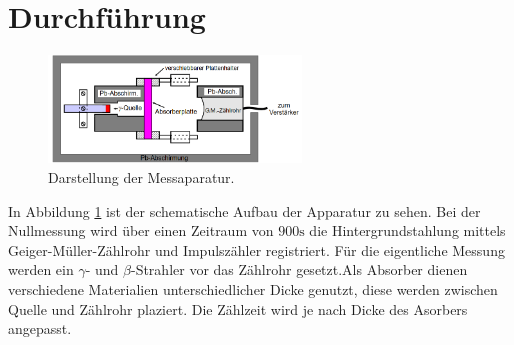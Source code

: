 \section{Durchführung}
\label{sec:Durchführung}
\begin{figure}
  \centering
  \includegraphics[width=0.6\textwidth]{aufbau.PNG}
  \caption{Darstellung der Messaparatur.}
  \label{fig:aufbau}
\end{figure}
In Abbildung \ref{fig:aufbau} ist der schematische Aufbau der Apparatur zu sehen.
Bei der Nullmessung wird über einen Zeitraum von $900\si{\second}$ die Hintergrundstahlung mittels
Geiger-Müller-Zählrohr und Impulszähler registriert.
Für die eigentliche Messung werden ein $\gamma$- und $\beta$-Strahler vor das Zählrohr gesetzt.Als
Absorber dienen verschiedene Materialien unterschiedlicher Dicke genutzt, diese werden zwischen Quelle und Zählrohr plaziert.
Die Zählzeit wird je nach Dicke des Asorbers angepasst.
